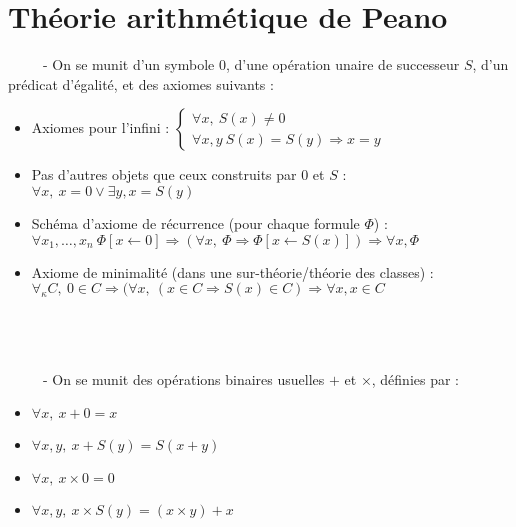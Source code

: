 \documentclass[11pt,a4paper]{article}
\begin{document}
\section{Théorie arithmétique de Peano}

\ \ \ \ \ - On se munit d'un symbole $0$, d'une opération unaire de successeur $S$, d'un prédicat d'égalité, et des axiomes suivants :
\begin{itemize}
\item Axiomes pour l'infini : $\begin{cases} \forall x, \ S(x) \neq 0 \\ \forall x,y \ S(x)=S(y) \Rightarrow x=y \end{cases}$
\item Pas d'autres objets que ceux construits par 0 et $S$ : $ \forall x, \ x=0 \lor \exists y,  x=S(y)$
\item Schéma d'axiome de récurrence (pour chaque formule $\Phi$) : \\
$ \forall x_1,\dots,x_n \ \Phi[x\leftarrow 0] \Rightarrow ( \forall x, \ \Phi \Rightarrow \Phi[x\leftarrow S(x)]) \Rightarrow \forall x, \Phi$
\item Axiome de minimalité (dans une sur-théorie/théorie des classes) : \\
$\forall_\kappa C, \ 0 \in C \Rightarrow ( \forall x, \ (x \in C \Rightarrow S(x) \in C) \Rightarrow \forall x, x \in C$
\\
\\
\\
\\
\end{itemize} 
\ \ \ \ \ - On se munit des opérations binaires usuelles $+$ et $\times$, définies par :
\begin{itemize}
\item $\forall x, \ x + 0 = x$
\item $\forall x,y, \ x+S(y)=S(x+y)$
\item $\forall x, \ x \times 0 = 0$
\item $\forall x,y, \ x\times S(y)=(x \times y)+ x$

\end{itemize}  
\end{document}
